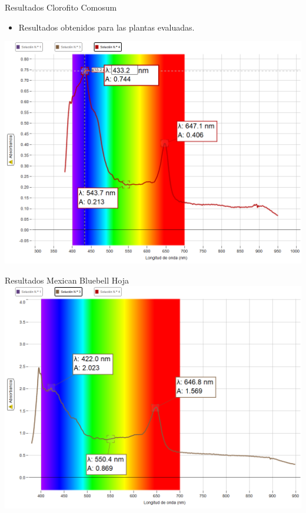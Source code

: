 \documentclass{beamer}
\begin{document}
\begin{frame}{Resultados Clorofito Comosum}
    \begin{itemize}
        \item Resultados obtenidos para las plantas evaluadas.
    \end{itemize}
    \includegraphics[scale=0.3]{clorofitoComosumCoordenadas.png}
\end{frame}

\begin{frame}{Resultados Mexican Bluebell Hoja}
    \includegraphics[scale=0.3]{MexicanBluebelHOJAcoorenadas.png}
\end{frame}
\end{document}
